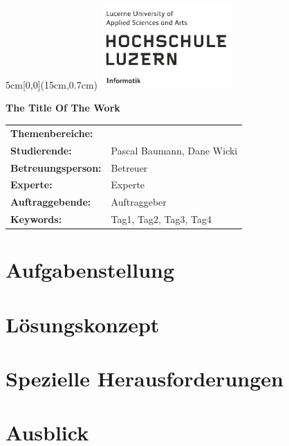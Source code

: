 \documentclass[
	a4paper
]{scrartcl}
\begin{document}

\begin{textblock*}{5cm}[0,0](15cm,0.7cm)
	\includegraphics[keepaspectratio,width=5cm]{img/HSLU_Logo}
\end{textblock*}

\vspace*{2cm}

\noindent
\textbf{\LARGE{The Title Of The Work}} \\

\vspace{0.5em}

\bgroup
\setlength\tabcolsep{0cm}

\begin{large}
\noindent
\begin{tabularx}{\textwidth}{p{5cm}X}
	\textbf{Themenbereiche:} & \\
	\textbf{Studierende:} & Pascal Baumann, Dane Wicki\\
	\textbf{Betreuungsperson:} & Betreuer\\
	\textbf{Experte:} & Experte\\
	\textbf{Auftraggebende:} & Auftraggeber\\
	\textbf{Keywords:} & Tag1, Tag2, Tag3, Tag4\\
\end{tabularx}
\end{large}
\egroup

\section{Aufgabenstellung}
\lipsum[2-4]

\newpage

\lipsum[2-4]

\section{Lösungskonzept}
\lipsum[1-1]

\section{Spezielle Herausforderungen}
\lipsum[1-1]

\section{Ausblick}
\lipsum[1-4]
\end{document}

